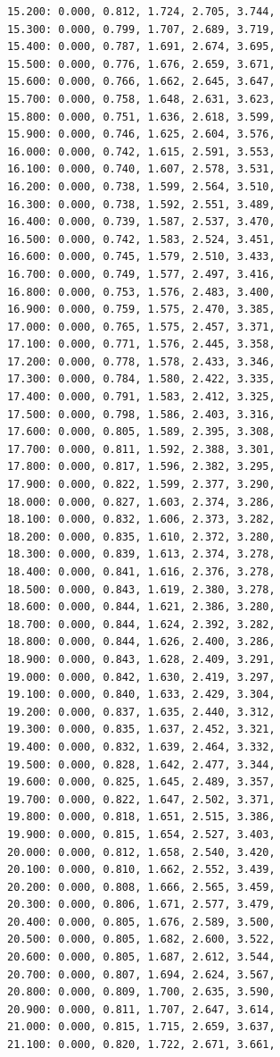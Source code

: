\documentclass[12pt, a4paper]{article}
\begin{document}
\begin{scriptsize}
\begin{ttfamily}
\begin{lstlisting}
15.200: 0.000, 0.812, 1.724, 2.705, 3.744, 
15.300: 0.000, 0.799, 1.707, 2.689, 3.719, 
15.400: 0.000, 0.787, 1.691, 2.674, 3.695, 
15.500: 0.000, 0.776, 1.676, 2.659, 3.671, 
15.600: 0.000, 0.766, 1.662, 2.645, 3.647, 
15.700: 0.000, 0.758, 1.648, 2.631, 3.623, 
15.800: 0.000, 0.751, 1.636, 2.618, 3.599, 
15.900: 0.000, 0.746, 1.625, 2.604, 3.576, 
16.000: 0.000, 0.742, 1.615, 2.591, 3.553, 
16.100: 0.000, 0.740, 1.607, 2.578, 3.531, 
16.200: 0.000, 0.738, 1.599, 2.564, 3.510, 
16.300: 0.000, 0.738, 1.592, 2.551, 3.489, 
16.400: 0.000, 0.739, 1.587, 2.537, 3.470, 
16.500: 0.000, 0.742, 1.583, 2.524, 3.451, 
16.600: 0.000, 0.745, 1.579, 2.510, 3.433, 
16.700: 0.000, 0.749, 1.577, 2.497, 3.416, 
16.800: 0.000, 0.753, 1.576, 2.483, 3.400, 
16.900: 0.000, 0.759, 1.575, 2.470, 3.385, 
17.000: 0.000, 0.765, 1.575, 2.457, 3.371, 
17.100: 0.000, 0.771, 1.576, 2.445, 3.358, 
17.200: 0.000, 0.778, 1.578, 2.433, 3.346, 
17.300: 0.000, 0.784, 1.580, 2.422, 3.335, 
17.400: 0.000, 0.791, 1.583, 2.412, 3.325, 
17.500: 0.000, 0.798, 1.586, 2.403, 3.316, 
17.600: 0.000, 0.805, 1.589, 2.395, 3.308, 
17.700: 0.000, 0.811, 1.592, 2.388, 3.301, 
17.800: 0.000, 0.817, 1.596, 2.382, 3.295, 
17.900: 0.000, 0.822, 1.599, 2.377, 3.290, 
18.000: 0.000, 0.827, 1.603, 2.374, 3.286, 
18.100: 0.000, 0.832, 1.606, 2.373, 3.282, 
18.200: 0.000, 0.835, 1.610, 2.372, 3.280, 
18.300: 0.000, 0.839, 1.613, 2.374, 3.278, 
18.400: 0.000, 0.841, 1.616, 2.376, 3.278, 
18.500: 0.000, 0.843, 1.619, 2.380, 3.278, 
18.600: 0.000, 0.844, 1.621, 2.386, 3.280, 
18.700: 0.000, 0.844, 1.624, 2.392, 3.282, 
18.800: 0.000, 0.844, 1.626, 2.400, 3.286, 
18.900: 0.000, 0.843, 1.628, 2.409, 3.291, 
19.000: 0.000, 0.842, 1.630, 2.419, 3.297, 
19.100: 0.000, 0.840, 1.633, 2.429, 3.304, 
19.200: 0.000, 0.837, 1.635, 2.440, 3.312, 
19.300: 0.000, 0.835, 1.637, 2.452, 3.321, 
19.400: 0.000, 0.832, 1.639, 2.464, 3.332, 
19.500: 0.000, 0.828, 1.642, 2.477, 3.344, 
19.600: 0.000, 0.825, 1.645, 2.489, 3.357, 
19.700: 0.000, 0.822, 1.647, 2.502, 3.371, 
19.800: 0.000, 0.818, 1.651, 2.515, 3.386, 
19.900: 0.000, 0.815, 1.654, 2.527, 3.403, 
20.000: 0.000, 0.812, 1.658, 2.540, 3.420, 
20.100: 0.000, 0.810, 1.662, 2.552, 3.439, 
20.200: 0.000, 0.808, 1.666, 2.565, 3.459, 
20.300: 0.000, 0.806, 1.671, 2.577, 3.479, 
20.400: 0.000, 0.805, 1.676, 2.589, 3.500, 
20.500: 0.000, 0.805, 1.682, 2.600, 3.522, 
20.600: 0.000, 0.805, 1.687, 2.612, 3.544, 
20.700: 0.000, 0.807, 1.694, 2.624, 3.567, 
20.800: 0.000, 0.809, 1.700, 2.635, 3.590, 
20.900: 0.000, 0.811, 1.707, 2.647, 3.614, 
21.000: 0.000, 0.815, 1.715, 2.659, 3.637, 
21.100: 0.000, 0.820, 1.722, 2.671, 3.661, 

\end{lstlisting}
\end{ttfamily}
\end{scriptsize}
\end{document}

